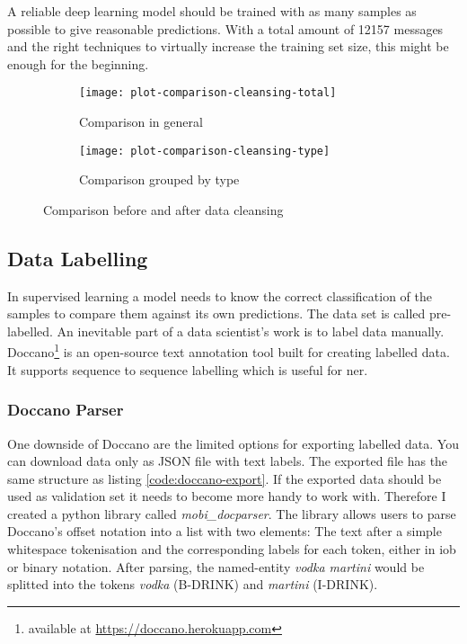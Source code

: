 A reliable deep learning model should be trained with as many samples as possible to give reasonable predictions. With a total amount of 12157
messages and the right techniques to virtually increase the training set size, this might be enough for the beginning.

\begin{figure}[!ht]
    \begin{subfigure}{0.5\textwidth}
        \texttt{[image: plot-comparison-cleansing-total]}
        \caption{Comparison in general}
        \label{fig:plot-comparison-cleansing}
    \end{subfigure}
    \begin{subfigure}{0.5\textwidth}
        \texttt{[image: plot-comparison-cleansing-type]}
        \caption{Comparison grouped by type}
        \label{fig:plot-comparison-cleansing-types}
    \end{subfigure}
    \caption{Comparison before and after data cleansing}
\end{figure}


\subsection{Data Labelling}

In supervised learning a model needs to know the correct classification of the samples to compare them against its own predictions. The data set
is called pre-labelled. An inevitable part of a data scientist's work is to label data manually. Doccano\footnote{available at
\url{https://doccano.herokuapp.com}} is an open-source text annotation tool built for creating labelled data. It supports sequence to sequence
labelling which is useful for \acrlong{ner}.

\subsubsection{Doccano Parser}

One downside of Doccano are the limited options for exporting labelled data. You can download data only as JSON file with text labels. The exported
file has the same structure as listing \ref{code:doccano-export}. If the exported data should be used as validation set it needs to become more
handy to work with. Therefore I created a python library called \emph{mobi\_docparser}. The library allows users to parse Doccano's offset notation
into a list with two elements: The text after a simple whitespace tokenisation and the corresponding labels for each token, either in \acrshort{iob}
or binary notation. After parsing, the named-entity \emph{vodka martini} would be splitted into the tokens \emph{vodka} (B-DRINK) and \emph{martini}
(I-DRINK).

